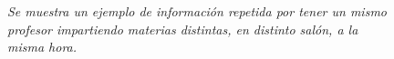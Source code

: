 \begin{itemize}





\begin{figure}[H]
	\centering
	\caption[\textit{Ejemplo de información repetida: Mismo profesor, misma hora, materias distintas}]{\textit{Se muestra un ejemplo de información repetida por tener un mismo profesor impartiendo materias distintas, en distinto salón, a la misma hora.}}\label{UnProfMuchasMaterias}
\end{figure}	

\end{itemize}
